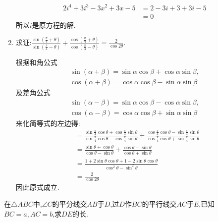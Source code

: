 \begin{questions}
\begin{enumerate}[label=(\arabic*)]
\begin{solution}
\begin{align*}
				      2i^4 + 3i^3 - 3x^2 + 3x - 5 & = 2 - 3i + 3  + 3i - 5 \\
				                                  & = 0
			      \end{align*}
			      所以$i$是原方程的解.
		      \end{solution}
		\item 求证:$\displaystyle
			      \frac{\sin\left(\frac{\pi}{4} + \theta \right)}{\sin \left( \frac{\pi}{4} - \theta \right)} +
			      \frac{\cos\left(\frac{\pi}{4} + \theta \right)}{\cos \left( \frac{\pi}{4} - \theta \right)} =
			      \frac{2}{\cos2\theta}
		      $.
		      \begin{solution}
			      根据和角公式
			      \[
				      \begin{array}{l}
					      \sin(\alpha+\beta) = \sin\alpha\cos\beta + \cos\alpha\sin\beta, \\
					      \cos(\alpha+\beta)=\cos\alpha\cos\beta - \sin\alpha\sin\beta
				      \end{array}
			      \]
			      及差角公式$$
				      \begin{array}{l}
					      \sin(\alpha-\beta) = \sin\alpha\cos\beta - \cos\alpha\sin\beta, \\
					      \cos(\alpha-\beta)=\cos\alpha\cos\beta + \sin\alpha\sin\beta
				      \end{array}
			      $$来化简等式的左边得:
			      \begin{align*}
				       & = 	\frac{\sin\frac{\pi}{4}\cos\theta +
					      \cos\frac{\pi}{4}\sin\theta}{\sin\frac{\pi}{4}\cos\theta-\cos\frac{\pi}{4}\sin\theta} +
				      \frac{\cos\frac{\pi}{4}\cos\theta - \sin\frac{\pi}{4}\sin\theta}{\cos\frac{\pi}{4}\cos\theta +
				      \sin\frac{\pi}{4}\sin\theta}                                                              \\
				       & =
				      \frac{\sin\theta + \cos\theta}{\cos\theta - \sin\theta} + \frac{\cos\theta -
				      \sin\theta}{\cos\theta + \sin\theta}                                                      \\
				       & =
				      \frac{1 + 2\sin\theta\cos\theta + 1 - 2\sin\theta\cos\theta}{\cos^2\theta - \sin^2\theta} \\
				       & = \frac{2}{\cos2\theta}
			      \end{align*}
			      因此原式成立.
		      \end{solution}
	\end{enumerate}
	\question 在$\triangle{ABC}$中,$\angle{C}$的平分线交$AB$于$D$,过$D$作$BC$的平行线交$AC$于$E$,已知$BC=a, AC=b$,求$DE$的长.


\end{questions}
